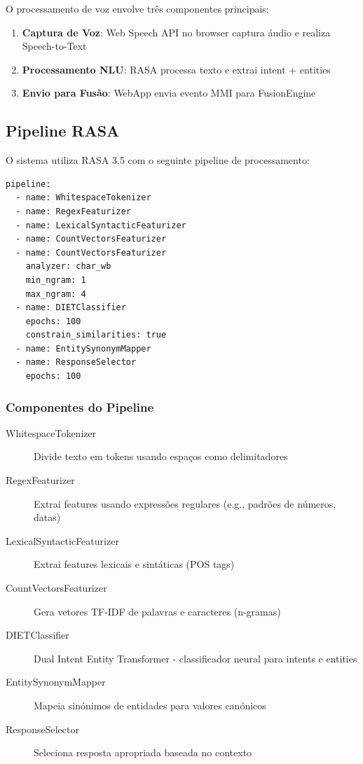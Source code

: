 O processamento de voz envolve três componentes principais:

\begin{enumerate}
    \item \textbf{Captura de Voz}: Web Speech API no browser captura áudio e realiza Speech-to-Text
    \item \textbf{Processamento NLU}: RASA processa texto e extrai intent + entities
    \item \textbf{Envio para Fusão}: WebApp envia evento MMI para FusionEngine
\end{enumerate}

\subsection{Pipeline RASA}

O sistema utiliza RASA 3.5 com o seguinte pipeline de processamento:

\begin{verbatim}
pipeline:
  - name: WhitespaceTokenizer
  - name: RegexFeaturizer
  - name: LexicalSyntacticFeaturizer
  - name: CountVectorsFeaturizer
  - name: CountVectorsFeaturizer
    analyzer: char_wb
    min_ngram: 1
    max_ngram: 4
  - name: DIETClassifier
    epochs: 100
    constrain_similarities: true
  - name: EntitySynonymMapper
  - name: ResponseSelector
    epochs: 100
\end{verbatim}

\subsubsection{Componentes do Pipeline}

\begin{description}
    \item[WhitespaceTokenizer] Divide texto em tokens usando espaços como delimitadores
    \item[RegexFeaturizer] Extrai features usando expressões regulares (e.g., padrões de números, datas)
    \item[LexicalSyntacticFeaturizer] Extrai features lexicais e sintáticas (POS tags)
    \item[CountVectorsFeaturizer] Gera vetores TF-IDF de palavras e caracteres (n-gramas)
    \item[DIETClassifier] Dual Intent Entity Transformer - classificador neural para intents e entities
    \item[EntitySynonymMapper] Mapeia sinónimos de entidades para valores canónicos
    \item[ResponseSelector] Seleciona resposta apropriada baseada no contexto
\end{description}

